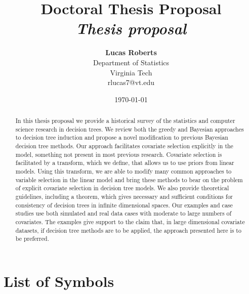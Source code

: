 \documentclass[12pt]{article}
\title{{\bf Doctoral Thesis Proposal} \\
\it Thesis proposal}
\author{ {\bf Lucas Roberts}  \\
Department of Statistics \\
Virginia Tech \\
{\small rlucas7@vt.edu}
}
\date{\today}
\def\listofsymbols{ \clearpage}
\begin{document}
\pagestyle{plain}
\maketitle


\pagebreak
\begin{abstract}
In this thesis proposal we provide a historical survey of the statistics and computer science research in decision trees. We review both the greedy and Bayesian approaches to decision tree induction and propose a novel modification to previous Bayesian decision tree methods. Our approach facilitates covariate selection explicitly in the model, something not present in most previous research. Covariate selection is facilitated by a transform, which we define,  that allows us to use priors from linear models. Using this transform, we are able to modify many common approaches to variable selection in the linear model and bring these methods to bear on the problem of explicit covariate selection in decision tree models. We also provide theoretical guidelines, including a theorem, which gives necessary and sufficient conditions for consistency of decision trees in infinite dimensional spaces. Our examples and case studies use both simulated and real data cases with moderate to large numbers of covariates. The examples give support to the claim that, in large dimensional covariate datasets, if decision tree methods are to be applied, the approach presented here is to be preferred.   


\end{abstract}

\pagebreak
\tableofcontents
\pagebreak

\listoffigures
\pagebreak

\listoftables
\pagebreak

\clearpage
{}
\chapter{\LARGE{\textbf{List of Symbols}}}
\listofsymbols
\pagebreak
\end{document}
